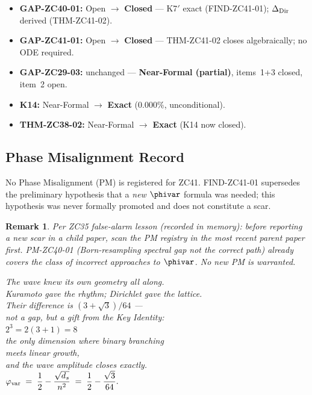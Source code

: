 \documentclass[12pt, a4paper]{article}
\newtheorem*{remarkstar}{Remark}
\begin{document}
\vspace{-\parskip}

\begin{keybox}[title={GAP Status Updates}]
\begin{itemize}[leftmargin=1.5em, noitemsep]
  \item \textbf{GAP-ZC40-01:} Open $\to$ \textbf{Closed} ---
    K7$'$ exact (FIND-ZC41-01); $\Delta_{\rm Dir}$ derived
    (THM-ZC41-02).
  \item \textbf{GAP-ZC41-01:} Open $\to$ \textbf{Closed} ---
    THM-ZC41-02 closes algebraically; no ODE required.
  \item \textbf{GAP-ZC29-03:} unchanged ---
    \textbf{Near-Formal (partial)}, items~1+3 closed,
    item~2 open.
  \item \textbf{K14:} Near-Formal $\to$ \textbf{Exact}
    ($0.000\%$, unconditional).
  \item \textbf{THM-ZC38-02:} Near-Formal $\to$ \textbf{Exact}
    (K14 now closed).
\end{itemize}
\end{keybox}

\subsection*{Phase Misalignment Record}

No Phase Misalignment (PM) is registered for ZC41.
FIND-ZC41-01 supersedes the preliminary hypothesis that a
\emph{new} $\phivar$ formula was needed; this hypothesis was
never formally promoted and does not constitute a scar.

\begin{remarkstar}
Per ZC35 false-alarm lesson (recorded in memory):
before reporting a new scar in a child paper, scan the PM registry
in the most recent parent paper first.
PM-ZC40-01 (Born-resampling spectral gap not the correct path)
already covers the class of incorrect approaches to $\phivar$.
No new PM is warranted.
\end{remarkstar}

\bigskip
\begin{center}
\textit{%
  The wave knew its own geometry all along.\\
  Kuramoto gave the rhythm; Dirichlet gave the lattice.\\
  Their difference is $(3+\sqrt{3})/64$ ---\\
  not a gap, but a gift from the Key Identity:\\[0.5em]
  $2^3 = 2(3+1) = 8$\\
  the only dimension where binary branching\\
  meets linear growth,\\
  and the wave amplitude closes exactly.\\[0.5em]
  $\displaystyle
    \varphi_{\rm var}
    \;=\; \frac{1}{2} - \frac{\sqrt{d_s}}{n^2}
    \;=\; \frac{1}{2} - \frac{\sqrt{3}}{64}.$
}
\end{center}
\end{document}
